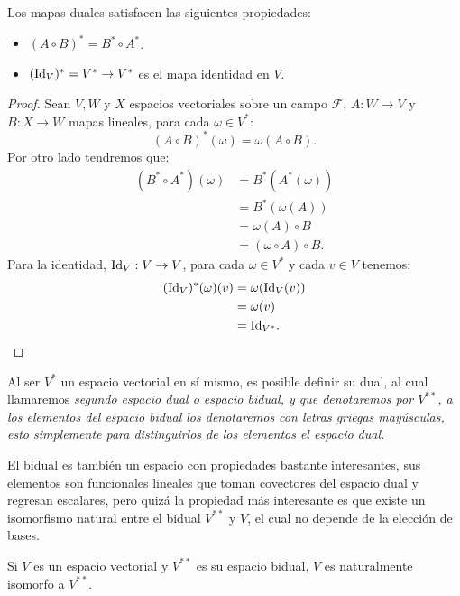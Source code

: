 \begin{lemma}
	Los mapas duales satisfacen las siguientes propiedades:
	\begin{itemize}
		\item $(A \circ B)^{*} = B^{*} \circ A^{*}$.
		\item $(\mathrm{Id}_V)^{*} = V^{*} \to V^{*}$ es el mapa identidad en $V$.
	\end{itemize}
\end{lemma}

\begin{proof}
	Sean $V,W$ y $X$ espacios vectoriales sobre un campo $\mathcal{F}$, $A: W \to V$ y $B: X \to W$ mapas lineales, para cada $\omega \in V^{*}$:
	\[ (A\circ B)^{*}(\omega) = \omega(A \circ B). \]
	Por otro lado tendremos que:
	\begin{align*}
		(B^* \circ A^*)(\omega) & = B^{*}(A^*(\omega))        \\
		                        & = B^{*}(\omega(A))          \\
		                        & = \omega(A) \circ B         \\
		                        & = (\omega \circ A) \circ B.
	\end{align*}
	Para la identidad, $\mathrm{Id}_V: V \to V$, para cada $\omega \in V^{*}$ y cada $v \in V$ tenemos:
	\begin{align*}
		(\mathrm{Id}_V)^{*}(\omega)(v) & = \omega(\mathrm{Id}_V(v)) \\
		                       & = \omega(v)        \\
		                       & = \mathrm{Id}_{V^{*}}.
	\end{align*}
\end{proof}

Al ser $V^{*}$ un espacio vectorial en sí mismo, es posible definir su dual, al cual llamaremos \it{segundo espacio dual} o \it{espacio bidual}, y que denotaremos por $V^{**}$, a los elementos del espacio bidual los denotaremos con letras griegas mayúsculas, esto simplemente para distinguirlos de los elementos el espacio dual.

El bidual es también un espacio con propiedades bastante interesantes, sus elementos son funcionales lineales que toman covectores del espacio dual y regresan escalares, pero quizá la propiedad más interesante es que existe un isomorfismo natural entre el bidual $V^{**}$ y $V$, el cual no depende de la elección de bases.

\begin{theorem}
	Si $V$ es un espacio vectorial y $V^{**}$ es su espacio bidual, $V$ es naturalmente isomorfo a $V^{**}$.
\end{theorem}

